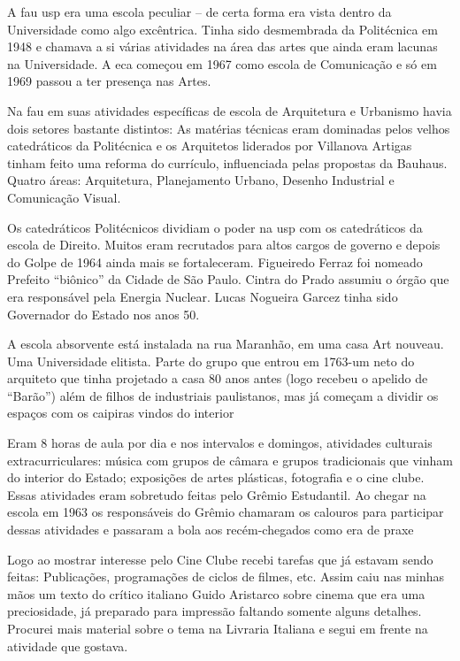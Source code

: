 A {\sc fau usp} era uma escola peculiar -- de certa forma era vista dentro da
Universidade como algo excêntrica. Tinha sido desmembrada da Politécnica
em 1948 e chamava a si várias atividades na área das artes que ainda
eram lacunas na Universidade. A {\sc eca} começou em 1967 como escola de
Comunicação e só em 1969 passou a ter presença nas Artes.

Na {\sc fau} em suas atividades específicas de escola de Arquitetura e
Urbanismo havia dois setores bastante distintos: As matérias técnicas
eram dominadas pelos velhos catedráticos da Politécnica e os Arquitetos
liderados por Villanova Artigas tinham feito uma reforma do currículo,
influenciada pelas propostas da Bauhaus. Quatro áreas: Arquitetura,
Planejamento Urbano, Desenho Industrial e Comunicação Visual.

Os catedráticos Politécnicos dividiam o poder na {\sc usp} com os catedráticos
da escola de Direito. Muitos eram recrutados para altos cargos de
governo e depois do Golpe de 1964 ainda mais se fortaleceram. Figueiredo
Ferraz foi nomeado Prefeito “biônico” da Cidade de São Paulo. Cintra do
Prado assumiu o órgão que era responsável pela Energia Nuclear. Lucas
Nogueira Garcez tinha sido Governador do Estado nos anos 50.

A escola absorvente está instalada na rua Maranhão, em uma casa Art
nouveau. Uma Universidade elitista. Parte do grupo que entrou em 1763-um
neto do arquiteto que tinha projetado a casa 80 anos antes (logo recebeu
o apelido de “Barão”) além de filhos de industriais paulistanos, mas já
começam a dividir os espaços com os caipiras vindos do interior

Eram 8 horas de aula por dia e nos intervalos e domingos, atividades
culturais extracurriculares: música com grupos de câmara e grupos
tradicionais que vinham do interior do Estado; exposições de artes
plásticas, fotografia e o cine clube. Essas atividades eram sobretudo
feitas pelo Grêmio Estudantil. Ao chegar na escola em 1963 os
responsáveis do Grêmio chamaram os calouros para participar dessas
atividades e passaram a bola aos recém-chegados como era de praxe

Logo ao mostrar interesse pelo Cine Clube recebi tarefas que já estavam
sendo feitas: Publicações, programações de ciclos de filmes, etc. Assim
caiu nas minhas mãos um texto do crítico italiano Guido Aristarco sobre
cinema que era uma preciosidade, já preparado para impressão faltando
somente alguns detalhes. Procurei mais material sobre o tema na Livraria
Italiana e segui em frente na atividade que gostava.

